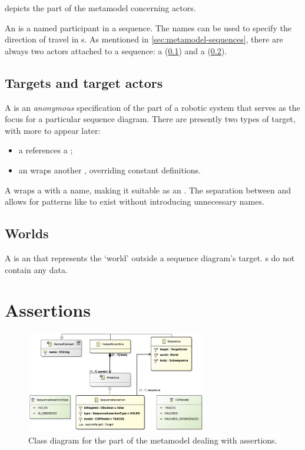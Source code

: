  depicts the part of the metamodel concerning
actors.

An \mactor{} is a named participant in a sequence.  The names can be used to
specify the direction of travel in \mmessagespec{}s.
As mentioned in
\cref{sec:metamodel-sequences}, there are always two actors
attached to a sequence: a \mtargetactor{} (\cref{ssec:metamodel-actors-target})
and a \mworld{} (\cref{ssec:metamodel-actors-world}).

\subsection{Targets and target actors}\label{ssec:metamodel-actors-target}

A \mtarget{} is an \emph{anonymous} specification of the part of a robotic
system that serves as the focus for a particular sequence diagram.  There are
presently two types of target, with more to appear later:

\begin{itemize}
\item
	a \mrcmoduletarget{} references a \mrcmodule;
\item
	an \moverridetarget{} wraps another \mtarget, overriding constant
	definitions.
\end{itemize}

A \mtargetactor{} wraps a \mtarget{} with a name, making it suitable as an
\mactor.  The separation between \mtarget{} and \mtargetactor{} allows for
patterns like \moverridetarget{} to exist without introducing unnecessary names.

\subsection{Worlds}\label{ssec:metamodel-actors-world}

A \mworld{} is an \mactor{} that represents the `world' outside a sequence
diagram's target.  \mworld s do not contain any data.

\section{Assertions}\label{sec:metamodel-assertions}

\begin{figure}
	\centering
	\includegraphics[width=0.7\textwidth]{diagrams/assertions.png}
	\caption{Class diagram for the part of the \langname{} metamodel dealing with assertions.}
	\label{fig:metamodel-assertions}
\end{figure}

